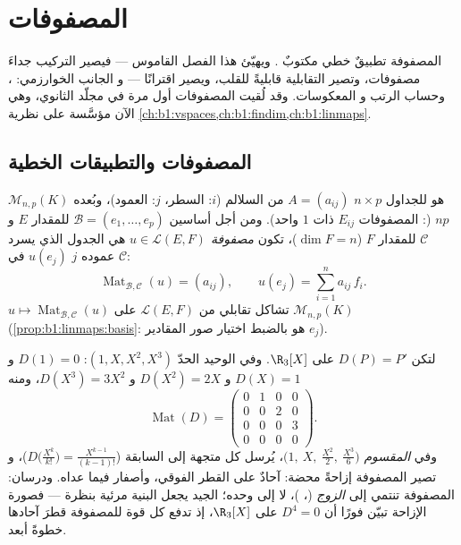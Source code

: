 \chapter{المصفوفات}\label{ch:b1:matrices}

المصفوفة تطبيقٌ خطي مكتوبٌ . ويهيّئ هذا الفصل
القاموس --- فيصير التركيب جداءَ مصفوفات، وتصير التقابلية
قابليةً للقلب، ويصير  اقترانًا --- و
الجانب الخوارزمي: ، وحساب الرتب و
المعكوسات. وقد لُقيت المصفوفات أول مرة في مجلّد الثانوي، وهي الآن
مؤسَّسة على نظرية
\cref{ch:b1:vspaces,ch:b1:findim,ch:b1:linmaps}.

\section{المصفوفات والتطبيقات الخطية}

\begin{definition}\label{def:b1:matrices:def}
$\mathcal{M}_{n,p}(K)$ هو  للجداول $n \times p$ $A
= (a_{ij})$ من السلالم ($i$: السطر، $j$: العمود)، وبُعده $np$
(: المصفوفات $E_{ij}$ ذات $1$ واحد). ومن أجل أساسين
$\mathcal{B} = (e_1, \dots, e_p)$ للمقدار $E$ و $\mathcal{C}$ للمقدار $F$
($\dim F = n$)، تكون \emph{مصفوفة $u \in \mathcal{L}(E, F)$} هي
الجدول الذي يسرد عموده $j$  $u(e_j)$ في
$\mathcal{C}$:
\[
\operatorname{Mat}_{\mathcal{B},\mathcal{C}}(u) = (a_{ij}),
\qquad u(e_j) = \sum_{i=1}^{n} a_{ij}\, f_i .
\]
 $u \mapsto \operatorname{Mat}_{\mathcal{B},\mathcal{C}}(u)$
تشاكل تقابلي من $\mathcal{L}(E, F)$ على
$\mathcal{M}_{n,p}(K)$ (\cref{prop:b1:linmaps:basis}: 
هو بالضبط اختيار صور المقادير $e_j$).
\end{definition}

\begin{example}
\label{ex:b1:matrices:derivative}
لتكن $D(P) = P'$ على $\R_3[X]$. وفي  الوحيد الحدّ $(1, X, X^2,
X^3)$: $D(1) = 0$ و $D(X) = 1$ و $D(X^2) = 2X$ و $D(X^3) = 3X^2$، ومنه
\[
\operatorname{Mat}(D) =
\begin{pmatrix}
0 & 1 & 0 & 0\\
0 & 0 & 2 & 0\\
0 & 0 & 0 & 3\\
0 & 0 & 0 & 0
\end{pmatrix}.
\]
وفي  \emph{المقسوم} $\bigl(1,\ X,\ \frac{X^2}2,\
\frac{X^3}6\bigr)$، يُرسل كل متجهة  إلى السابقة
($D\bigl(\frac{X^k}{k!}\bigr) = \frac{X^{k-1}}{(k-1)!}$)، و
تصير المصفوفة إزاحةً محضة: آحادٌ على القطر الفوقي، وأصفار
فيما عداه. ودرسان: المصفوفة تنتمي إلى \emph{الزوج}
(، )، لا إلى  وحده؛  الجيد يجعل
البنية مرئية بنظرة --- فصورة الإزاحة تبيّن فورًا
أن $D^4 = 0$ على $\R_3[X]$، إذ تدفع كل قوة للمصفوفة
قطرَ آحادها خطوةً أبعد.
\end{example}

